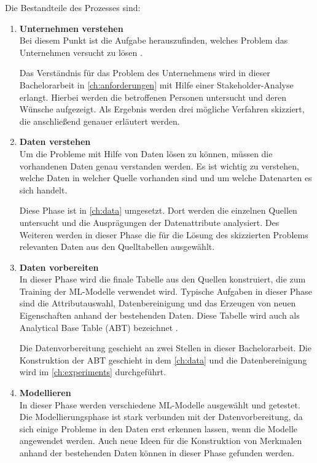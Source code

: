 Die Bestandteile des Prozesses sind: \\
\begin{enumerate}
 \item \textbf{Unternehmen verstehen} \\
 Bei diesem Punkt ist die Aufgabe herauszufinden, welches Problem das Unternehmen versucht zu lösen \cite{d.kelleher2015crispdm}.
 
 Das Verständnis für das Problem des Unternehmens wird in dieser Bachelorarbeit in \autoref{ch:anforderungen} mit Hilfe einer Stakeholder-Analyse erlangt. Hierbei werden die betroffenen Personen untersucht und deren Wünsche aufgezeigt. Als Ergebnis werden drei mögliche Verfahren skizziert, die anschließend genauer erläutert werden.  
 
 \item \textbf{Daten verstehen} \\
 Um die Probleme mit Hilfe von Daten lösen zu können, müssen die vorhandenen Daten genau verstanden werden. Es ist wichtig zu verstehen, welche Daten in welcher Quelle vorhanden sind und um welche Datenarten es sich handelt. \cite{d.kelleher2015crispdm} 
 
 Diese Phase ist in \autoref{ch:data} umgesetzt. Dort werden die einzelnen Quellen untersucht und die Ausprägungen der Datenattribute analysiert. Des Weiteren werden in dieser Phase die für die Lösung des skizzierten Problems relevanten Daten aus den Quelltabellen ausgewählt. 
 
 \item \textbf{Daten vorbereiten} \\
 In dieser Phase wird die finale Tabelle aus den Quellen konstruiert, die zum Training der ML-Modelle verwendet wird. Typische Aufgaben in dieser Phase sind die Attributauswahl, Datenbereinigung und das Erzeugen von neuen Eigenschaften anhand der bestehenden Daten. \cite{wirth2000} Diese Tabelle wird auch als Analytical Base Table (ABT) bezeichnet \cite{d.kelleher2015crispdm}.
 
 Die Datenvorbereitung geschieht an zwei Stellen in dieser Bachelorarbeit. 
 Die Konstruktion der ABT geschieht in dem \autoref{ch:data} und die Datenbereinigung wird im \autoref{ch:experiments} durchgeführt. %
 
 \item \textbf{Modellieren} \\
 In dieser Phase werden verschiedene ML-Modelle ausgewählt und getestet.
 Die Modellierungsphase ist stark verbunden mit der Datenvorbereitung, da sich einige Probleme in den Daten erst erkennen lassen, wenn die Modelle angewendet werden. 
 Auch neue Ideen für die Konstruktion von Merkmalen anhand der bestehenden Daten können in dieser Phase gefunden werden. \cite{wirth2000}
 

\end{enumerate}

